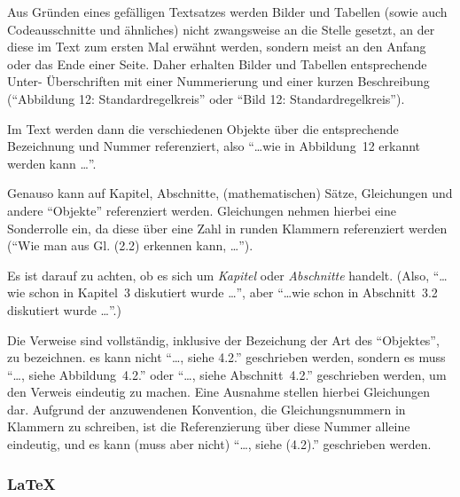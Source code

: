 Aus Gründen eines gefälligen Textsatzes werden Bilder und Tabellen (sowie \zT auch Codeausschnitte und ähnliches) nicht zwangsweise an die Stelle gesetzt, an der diese im Text zum ersten Mal erwähnt werden, sondern meist an den Anfang oder das Ende einer Seite.
Daher erhalten Bilder und Tabellen entsprechende Unter- \bzw Überschriften mit einer Nummerierung und einer kurzen Beschreibung (\zB "`Abbildung 12: Standardregelkreis"' oder "`Bild 12: Standardregelkreis"').

Im Text werden dann die verschiedenen Objekte über die entsprechende Bezeichnung und Nummer referenziert, also \zB "`\ldots wie in Abbildung~12 erkannt werden kann \ldots"'.

Genauso kann auf Kapitel, Abschnitte, (mathematischen) Sätze, Gleichungen und andere "`Objekte"' referenziert werden.
Gleichungen nehmen hierbei eine Sonderrolle ein, da diese über eine Zahl in runden Klammern referenziert werden ("`Wie man aus Gl. (2.2) erkennen kann, \ldots"').

Es ist darauf zu achten, ob es sich um \emph{Kapitel} oder \emph{Abschnitte} handelt.
(Also, "`\ldots wie schon in Kapitel~3 diskutiert wurde \ldots"', aber "`\ldots wie schon in Abschnitt~3.2 diskutiert wurde \ldots"'.)

Die Verweise sind vollständig, inklusive der Bezeichung der Art des "`Objektes"', zu bezeichnen.
\Dah es kann nicht "`\ldots, siehe 4.2."' geschrieben werden, sondern es muss \zB "`\ldots, siehe Abbildung~4.2."' oder "`\ldots, siehe Abschnitt~4.2."' geschrieben werden, um den Verweis eindeutig zu machen.
Eine Ausnahme stellen hierbei Gleichungen dar.
Aufgrund der anzuwendenen Konvention, die Gleichungsnummern in Klammern zu schreiben, ist die Referenzierung über diese Nummer alleine eindeutig, und es kann (muss aber nicht) "`\ldots, siehe (4.2)."' geschrieben werden.


\subsubsection*{\LaTeX}

